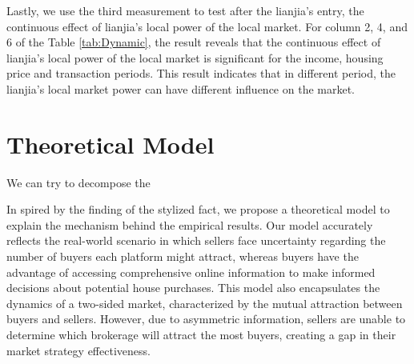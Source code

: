 Lastly, we use the third measurement to test after the lianjia's entry, the continuous effect of lianjia's local power of the local market. For column 2, 4, and 6 of the Table \ref{tab:Dynamic}, the result reveals that the continuous effect of lianjia's local power of the local market is significant for the income, housing price and transaction periods. This result indicates that in different period, the lianjia's local market power can have different influence on the market.












































\section{Theoretical Model} \label{sec:theoretical_model}





We can try to decompose the 






In spired by the finding of the stylized fact, we propose a theoretical model to explain the mechanism behind the empirical results. Our model accurately reflects the real-world scenario in which sellers face uncertainty regarding the number of buyers each platform might attract, whereas buyers have the advantage of accessing comprehensive online information to make informed decisions about potential house purchases. This model also encapsulates the dynamics of a two-sided market, characterized by the mutual attraction between buyers and sellers. However, due to asymmetric information, sellers are unable to determine which brokerage will attract the most buyers, creating a gap in their market strategy effectiveness.

